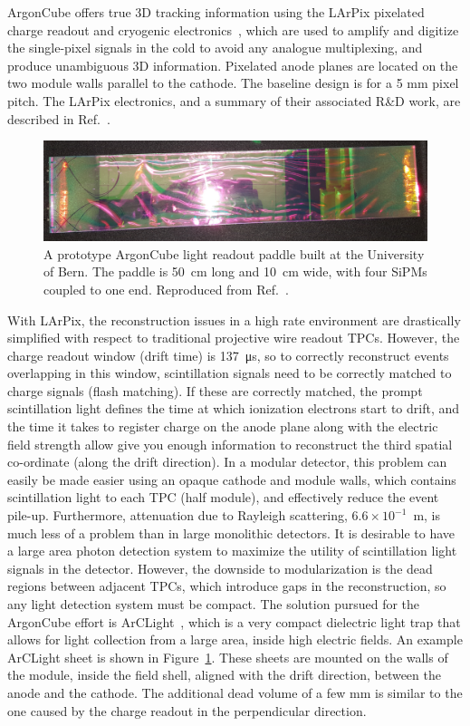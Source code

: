 ArgonCube offers true 3D tracking information using the LArPix pixelated charge readout and cryogenic electronics~\cite{larpix}, which are used to amplify and digitize the single-pixel signals in the cold to avoid any analogue multiplexing, and produce unambiguous 3D information. Pixelated anode planes are located on the two module walls parallel to the cathode. The baseline design is for a 5 mm pixel pitch. The LArPix electronics, and a summary of their associated R\&D work, are described in Ref.~\cite{larpix}.

\begin{figure}[!ht]
\centering
\includegraphics[width=0.75 \linewidth]{plots/1Film50x10.png}
\caption{A prototype ArgonCube light readout paddle built at the University of Bern. The paddle is 50~cm long and 10~cm wide, with four SiPMs coupled to one end. Reproduced from Ref.~\cite{argoncube_loi}.}
\label{fig:arclight}
\end{figure}

With LArPix, the reconstruction issues in a high rate environment are drastically simplified with respect to traditional projective wire readout TPCs. However, the charge readout window (drift time) is \SI{137}{\micro\second}, so to correctly reconstruct events overlapping in this window, scintillation signals need to be correctly matched to charge signals (flash matching). If these are correctly matched, the prompt scintillation light defines the time at which ionization electrons start to drift, and the time it takes to register charge on the anode plane along with the electric field strength allow give you enough information to reconstruct the third spatial co-ordinate (along the drift direction). In a modular detector, this problem can easily be made easier using an opaque cathode and module walls, which contains scintillation light to each TPC (half module), and effectively reduce the event pile-up. Furthermore, attenuation due to Rayleigh scattering, $6.6\times10^{-1}$~m, is much less of a problem than in large monolithic detectors. It is desirable to have a large area photon detection system to maximize the utility of scintillation light signals in the detector. However, the downside to modularization is the dead regions between adjacent TPCs, which introduce gaps in the reconstruction, so any light detection system must be compact. The solution pursued for the ArgonCube effort is ArCLight~\cite{arclight}, which is a very compact dielectric light trap that allows for light collection from a large area, inside high electric fields. An example ArCLight sheet is shown in Figure~\ref{fig:arclight}. These sheets are mounted on the walls of the module, inside the field shell, aligned with the drift direction, between the anode and the cathode. The additional dead volume of a few \si{\milli\metre} is similar to the one caused by the charge readout in the perpendicular direction.


